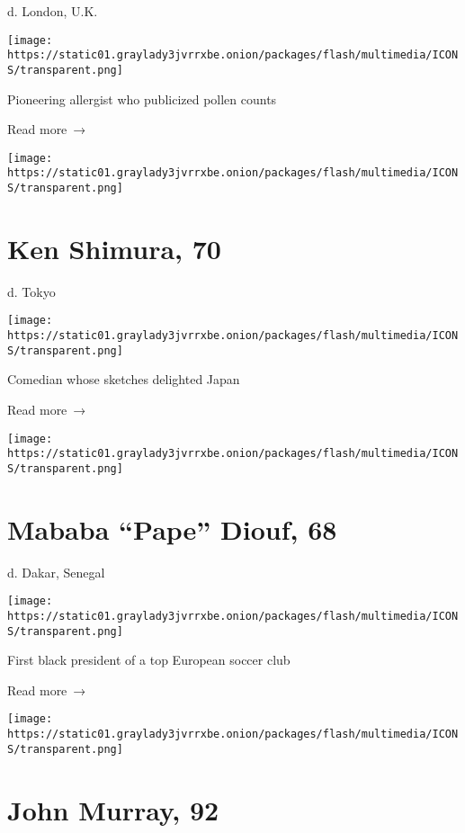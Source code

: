 d. London, U.K.

\texttt{[image: https://static01.graylady3jvrrxbe.onion/packages/flash/multimedia/ICONS/transparent.png]}

Pioneering allergist who publicized pollen counts

 Read more~→

\href{https://www.nytimes3xbfgragh.onion/2020/04/02/obituaries/ken-shimura-dead-coronavirus.html}{}

\texttt{[image: https://static01.graylady3jvrrxbe.onion/packages/flash/multimedia/ICONS/transparent.png]}

\hypertarget{ken-shimura-70}{%
\section{Ken Shimura, 70}\label{ken-shimura-70}}

d. Tokyo

\texttt{[image: https://static01.graylady3jvrrxbe.onion/packages/flash/multimedia/ICONS/transparent.png]}

Comedian whose sketches delighted Japan

 Read more~→

\href{https://www.nytimes3xbfgragh.onion/2020/04/02/obituaries/mababa-pape-diouf-dead-coronavirus.html}{}

\texttt{[image: https://static01.graylady3jvrrxbe.onion/packages/flash/multimedia/ICONS/transparent.png]}

\hypertarget{mababa-pape-diouf-68}{%
\section{Mababa ``Pape'' Diouf, 68}\label{mababa-pape-diouf-68}}

d. Dakar, Senegal

\texttt{[image: https://static01.graylady3jvrrxbe.onion/packages/flash/multimedia/ICONS/transparent.png]}

First black president of a top European soccer club

 Read more~→

\href{https://www.nytimes3xbfgragh.onion/2020/04/02/science/john-murray-dead-coronavirus.html}{}

\texttt{[image: https://static01.graylady3jvrrxbe.onion/packages/flash/multimedia/ICONS/transparent.png]}

\hypertarget{john-murray-92}{%
\section{John Murray, 92}\label{john-murray-92}}

